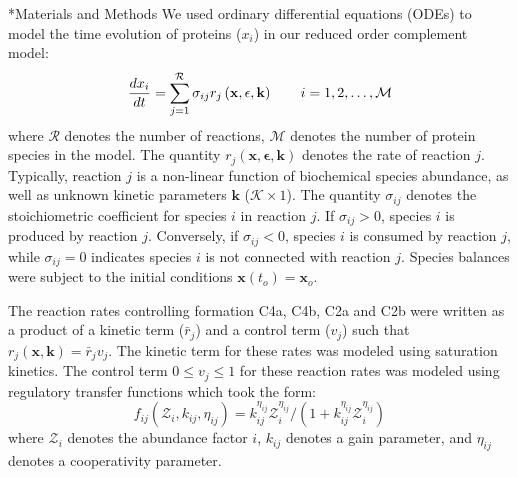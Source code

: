 \documentclass[12pt]{article}
\makeatletter
\renewcommand\section{\@startsection
	{subsection}{2}{0mm}
	{-0.2in}
	{0.05\baselineskip}
	{\normalfont\large\bfseries}}
\makeatother
\begin{document}
\clearpage

\section*{Materials and Methods}
We used ordinary differential equations (ODEs) to model the time evolution of proteins ($x_{i}$) in our reduced order complement model:
\begin{equation}
	\frac{dx_{i}}{dt}  =  \sum_{j = 1}^{\mathcal{R}}\sigma_{ij}r_{j}\left(\mathbf{x},\mathbf{\epsilon},\mathbf{k}\right)\qquad{i=1,2,\hdots,\mathcal{M}}\\
\end{equation}
where $\mathcal{R}$ denotes the number of reactions, $\mathcal{M}$ denotes the number of protein species in the model.
The quantity $r_{j}\left(\mathbf{x},\mathbf{\epsilon},\mathbf{k}\right)$ denotes the rate of reaction $j$.
Typically, reaction $j$ is a non-linear function of biochemical species abundance, as well as unknown kinetic parameters $\mathbf{k}$ ($\mathcal{K}\times{1}$).
The quantity $\sigma_{ij}$ denotes the stoichiometric coefficient for species $i$ in reaction $j$.
If $\sigma_{ij}>0$, species $i$ is produced by reaction $j$.
Conversely, if $\sigma_{ij}<0$, species $i$ is consumed by reaction $j$, while $\sigma_{ij} = 0$ indicates species $i$ is not connected with reaction $j$.
Species balances were subject to the initial conditions $\mathbf{x}\left(t_{o}\right) = \mathbf{x}_{o}$.

The reaction rates controlling formation C4a, C4b, C2a and C2b were written as a product of a kinetic term ($\bar{r}_{j}$) and a control term ($v_{j}$) such that $r_{j}\left(\mathbf{x},\mathbf{k}\right) = \bar{r}_{j}v_{j}$. The kinetic term for these rates was modeled using saturation kinetics.  The control term $0\leq v_{j}\leq 1$ for these reaction rates was modeled using regulatory transfer functions which took the form:
\begin{equation}\label{eqn:control-factor}
	f_{ij}\left(\mathcal{Z}_{i},k_{ij},\eta_{ij}\right) = k_{ij}^{\eta_{ij}}\mathcal{Z}_{i}^{\eta_{ij}}/\left({1 + k_{ij}^{\eta_{ij}}\mathcal{Z}_{i}^{\eta_{ij}}}\right)
\end{equation}where $\mathcal{Z}_{i}$ denotes the abundance factor $i$, $k_{ij}$ denotes a gain parameter, and $\eta_{ij}$ denotes a cooperativity parameter.
\end{document}
